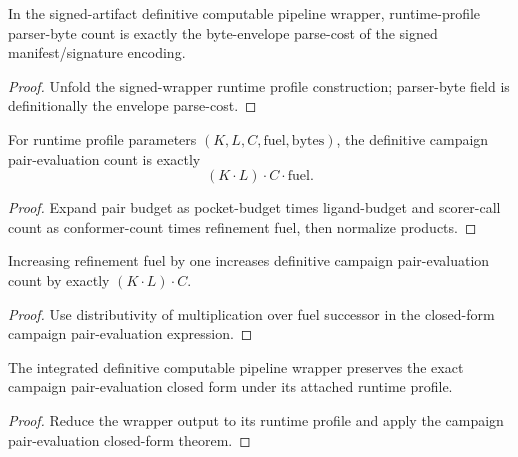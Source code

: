 \begin{theorem}
\label{thm:definitive-signed-pipeline-parser-bytes-exact}
In the signed-artifact definitive computable pipeline wrapper, runtime-profile parser-byte count is exactly the byte-envelope parse-cost of the signed manifest/signature encoding.
\end{theorem}

\begin{proof}
Unfold the signed-wrapper runtime profile construction; parser-byte field is definitionally the envelope parse-cost.
\end{proof}

\begin{theorem}
\label{thm:definitive-campaign-pair-evals-closed-form}
For runtime profile parameters $(K,L,C,\mathrm{fuel},\mathrm{bytes})$, the definitive campaign pair-evaluation count is exactly
\[
(K\cdot L)\cdot C\cdot \mathrm{fuel}.
\]
\end{theorem}

\begin{proof}
Expand pair budget as pocket-budget times ligand-budget and scorer-call count as conformer-count times refinement fuel, then normalize products.
\end{proof}

\begin{theorem}
\label{thm:definitive-campaign-pair-evals-succ-recurrence}
Increasing refinement fuel by one increases definitive campaign pair-evaluation count by exactly $(K\cdot L)\cdot C$.
\end{theorem}

\begin{proof}
Use distributivity of multiplication over fuel successor in the closed-form campaign pair-evaluation expression.
\end{proof}

\begin{theorem}
\label{thm:definitive-pipeline-campaign-pair-evals-closed-form}
The integrated definitive computable pipeline wrapper preserves the exact campaign pair-evaluation closed form under its attached runtime profile.
\end{theorem}

\begin{proof}
Reduce the wrapper output to its runtime profile and apply the campaign pair-evaluation closed-form theorem.
\end{proof}

